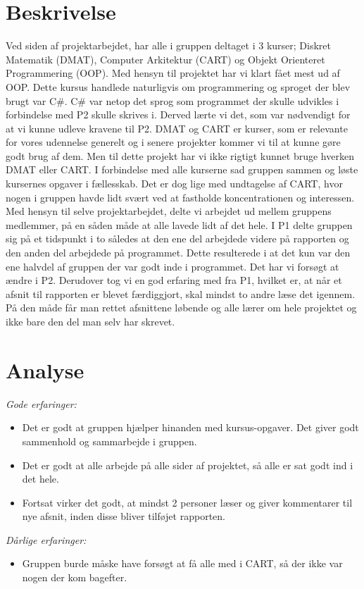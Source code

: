 \section{Beskrivelse}
Ved siden af projektarbejdet, har alle i gruppen deltaget i 3 kurser; Diskret Matematik (DMAT), Computer Arkitektur (CART) og Objekt Orienteret Programmering (OOP). Med hensyn til projektet har vi klart fået mest ud af OOP. Dette kursus handlede naturligvis om programmering og sproget der blev brugt var C\#. C\# var netop det sprog som programmet der skulle udvikles i forbindelse med P2 skulle skrives i. Derved lærte vi det, som var nødvendigt for at vi kunne udleve kravene til P2. DMAT og CART er kurser, som er relevante for vores udennelse generelt og i senere projekter kommer vi til at kunne gøre godt brug af dem. Men til dette projekt har vi ikke rigtigt kunnet bruge hverken DMAT eller CART.
I forbindelse med alle kurserne sad gruppen sammen og løste kursernes opgaver i fællesskab. Det er dog lige med undtagelse af CART, hvor nogen i gruppen havde lidt svært ved at fastholde koncentrationen og interessen.
Med hensyn til selve projektarbejdet, delte vi arbejdet ud mellem gruppens medlemmer, på en såden måde at alle lavede lidt af det hele. I P1 delte gruppen sig på et tidspunkt i to således at den ene del arbejdede videre på rapporten og den anden del arbejdede på programmet. Dette resulterede i at det kun var den ene halvdel af gruppen der var godt inde i programmet. Det har vi forsøgt at ændre i P2.
Derudover tog vi en god erfaring med fra P1, hvilket er, at når et afsnit til rapporten er blevet færdiggjort, skal mindst to andre læse det igennem. På den måde får man rettet afsnittene løbende og alle lærer om hele projektet og ikke bare den del man selv har skrevet. 

\section{Analyse}

\emph{Gode erfaringer:}
\begin{itemize}
\item Det er godt at gruppen hjælper hinanden med kursus-opgaver. Det giver godt sammenhold og sammarbejde i gruppen. 

\item Det er godt at alle arbejde på alle sider af projektet, så alle er sat godt ind i det hele.

\item	Fortsat virker det godt, at mindst 2 personer læser og giver kommentarer til nye afsnit, inden disse bliver tilføjet rapporten.
\end{itemize}\emph{Dårlige erfaringer:}
\begin{itemize}
\item	Gruppen burde måske have forsøgt at få alle med i CART, så der ikke var nogen der kom bagefter.

\end{itemize}	 

